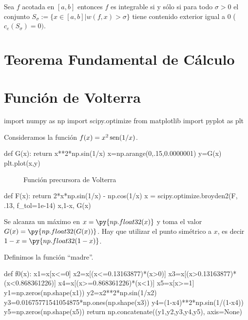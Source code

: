  \begin{teorema}{}  Sea $f$ acotada en $[a,b]$ entonces $f$ es integrable si y sólo si para todo $\sigma>0$ el conjunto $S_{\sigma}:=\{x\in [a,b]| w(f,x)>\sigma\}$ tiene contenido exterior igual a $0$ ($c_e(S_{\sigma})=0)$.
   \end{teorema}


\section{Teorema Fundamental de Cálculo}


\section{Función de Volterra}

\begin{pyblock}
import numpy as np
import scipy.optimize
from matplotlib import pyplot as plt
\end{pyblock}

Consideramos  la función $f(x)=x^2\operatorname{sen}(1/x)$. 

\begin{pyblock}
def G(x):
    return x**2*np.sin(1/x)
x=np.arange(0,.15,0.0000001)
y=G(x)
plt.plot(x,y)
\end{pyblock}


 \begin{figure}[h]
 \begin{center}
 \caption{Función precursora de Volterra}
\end{center}
 \end{figure}





\begin{pyblock}
def F(x):
    return 2*x*np.sin(1/x) - np.cos(1/x)
x = scipy.optimize.broyden2(F, .13, f_tol=1e-14)
x,1-x, G(x)
\end{pyblock}

Se alcanza un máximo en $x=\py{np.float32(x)}$ y toma el valor $G(x)=\py{np.float32(G(x))}$. Hay que utilizar el punto simétrico a $x$, es decir $1-x=\py{np.float32(1-x)}$.


Definimos la función ``madre''.



\begin{pyblock}
def f0(x):
    x1=x[x<=0]
    x2=x[(x<=0.13163877)*(x>0)]
    x3=x[(x>0.13163877)*(x<0.868361226)]
    x4=x[(x>=0.868361226)*(x<1)]
    x5=x[x>=1]
    y1=np.zeros(np.shape(x1))
    y2=x2**2*np.sin(1/x2)
    y3=0.01675771541054875*np.ones(np.shape(x3))
    y4=(1-x4)**2*np.sin(1/(1-x4))
    y5=np.zeros(np.shape(x5))
    return np.concatenate((y1,y2,y3,y4,y5), axis=None)
\end{pyblock}

